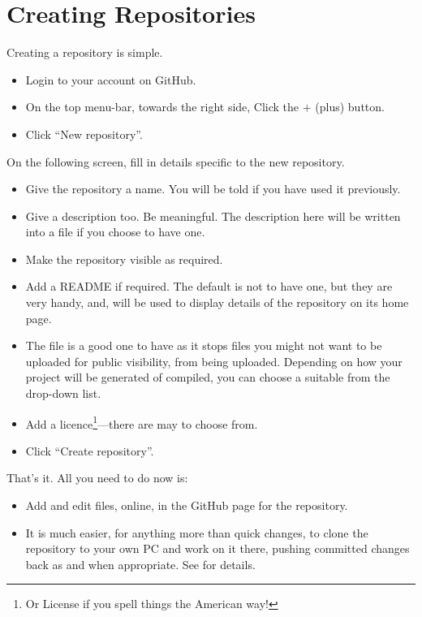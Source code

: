\chapter{Creating Repositories}\label{chap: Creating Repositories}

Creating a repository is simple.

\begin{itemize}
    \item Login to your account on GitHub.
    \item On the top menu-bar, towards the right side, Click the $+$ (plus) button.
    \item Click ``New repository''.
\end{itemize}

On the following screen, fill in details specific to the new repository.

\begin{itemize}
    \item Give the repository a name. You will be told if you have used it previously.
    \item Give a description too. Be meaningful. The description here will be written into a  file if you choose to have one.
    \item Make the repository visible as required.
    \item Add a README if required. The default is not to have one, but they are very handy, and, will be used to display details of the repository on its home page.
    \item The  file is a good one to have as it stops files you might not want to be uploaded for public visibility, from being uploaded. Depending on how your project will be generated of compiled, you can choose a suitable  from the drop-down list.
    \item Add a licence\footnote{Or License if you spell things the American way!}---there are may to choose from.
    \item Click ``Create repository''.
\end{itemize}

That's it. All you need to do now is:

\begin{itemize}
    \item Add and edit files, online, in the GitHub page for the repository.
    \item It is much easier, for anything more than quick changes, to clone the repository to your own PC and work on it there, pushing committed changes back as and when appropriate. See  for details.
\end{itemize}

